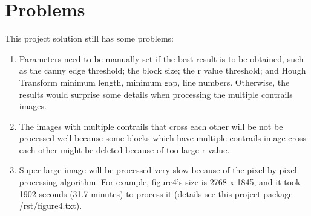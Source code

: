 \section{Problems}
This project solution still has some problems:
\begin{enumerate}
\item Parameters need to be manually set if the best result is to be obtained, such as the canny edge threshold; the block size; the r value threshold; and Hough Transform minimum length, minimum gap, line numbers. Otherwise, the results would surprise some details when processing the multiple contrails images.
\item The images with multiple contrails that cross each other will be not be processed well because some blocks which have multiple contrails image cross each other might be deleted because of too large r value.
\item Super large image will be processed very slow because of the pixel by pixel processing algorithm. For example, figure4’s size is 2768 x 1845, and it took 1902 seconds (31.7 minutes) to process it (details see this project package /rst/figure4.txt).
\end{enumerate}
